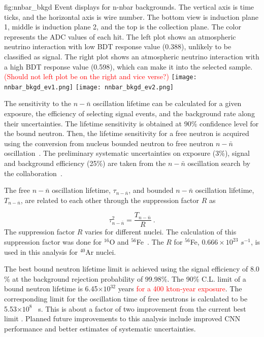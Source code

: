\begin{dunefigure}
{fig:nnbar_bkgd}
{Event displays for n-nbar backgrounds.  The vertical axis is time ticks, and the horizontal axis is wire number.  The bottom view is induction plane 1, middle is induction plane 2, and the top is the collection plane.  The color represents the ADC values of each hit.  The left plot shows an atmospheric neutrino interaction with low BDT response value (0.388), unlikely to be classified as signal. The right plot shows an atmospheric neutrino interaction with a high BDT response value (0.598), which can make it into the selected sample. \textcolor{red}{(Should not left plot be on the right and vice verse?)}}
\texttt{[image: nnbar\_bkgd\_ev1.png]}
\texttt{[image: nnbar\_bkgd\_ev2.png]}
\end{dunefigure} 

The sensitivity to the $n-\bar{n}$ oscillation lifetime can be calculated for a given exposure, the efficiency of selecting signal events, and the background rate along their uncertainties. The lifetime sensitivity is obtained at 90\% confidence level for the bound neutron. Then, the lifetime sensitivity for a free neutron is acquired using the conversion from nucleus bounded neutron to free neutron $n-\bar{n}$ oscillation~\cite{Friedman:2008es}.  The preliminary systematic uncertainties on exposure (3\%), signal and background efficiency (25\%) are taken from the $n-\bar{n}$ oscillation search by the \superk collaboration~\cite{Abe:2011ky}.

The free $n-\bar{n}$ oscillation lifetime, $\tau_{n-\bar{n}}$, and bounded $n-\bar{n}$ oscillation lifetime, $T_{n-\bar{n}}$, are related to each other through the suppression factor $R$ as

\begin{equation}
    \tau^{2}_{n-\bar{n}} = \frac{T_{n-\bar{n}}}{R} ~.
    \label{eq:tau}
\end{equation}
The suppression factor $R$ varies for different nuclei. The calculation of this suppression factor was done for $^{16}$O and $^{56}$Fe~\cite{Friedman:2008es}. The $R$ for $^{56}$Fe, $0.666\times10^{23}$ $s^{-1}$, is used in this analysis for $^{40}$Ar nuclei.

The best bound neutron lifetime limit is achieved using the signal efficiency of 8.0$\%$ at the background rejection probability of 99.98$\%$. The 90$\%$ C.L. limit of a bound neutron lifetime is 6.45$\times 10^{32}$ years \textcolor{red}{for a 400 kton-year exposure}. The corresponding  limit for the oscillation time of free neutrons is calculated to be 5.53$\times 10^{8}$ ~s. This is about a factor of two improvement from the current best limit \cite{Abe:2011ky}.  Planned future improvements to this analysis include improved CNN performance and better estimates of systematic uncertainties.

